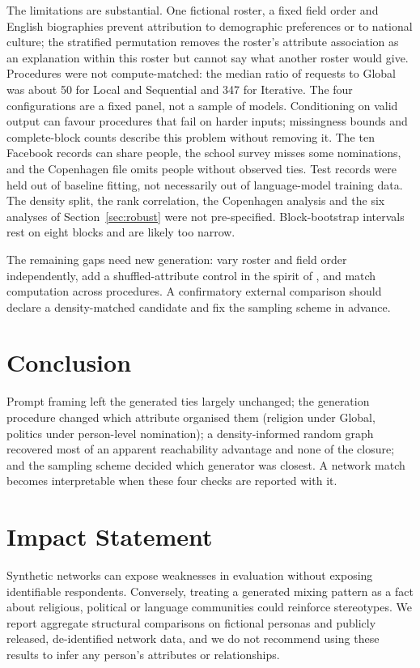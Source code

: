 \documentclass{article}
\begin{document}
The limitations are substantial. One fictional roster, a fixed field order and English biographies prevent attribution to demographic preferences or to national culture; the stratified permutation removes the roster's attribute association as an explanation within this roster but cannot say what another roster would give. Procedures were not compute-matched: the median ratio of requests to Global was about 50 for Local and Sequential and 347 for Iterative. The four configurations are a fixed panel, not a sample of models. Conditioning on valid output can favour procedures that fail on harder inputs; missingness bounds and complete-block counts describe this problem without removing it. The ten Facebook records can share people, the school survey misses some nominations, and the Copenhagen file omits people without observed ties. Test records were held out of baseline fitting, not necessarily out of language-model training data. The density split, the rank correlation, the Copenhagen analysis and the six analyses of Section~\ref{sec:robust} were not pre-specified. Block-bootstrap intervals rest on eight blocks and are likely too narrow.

The remaining gaps need new generation: vary roster and field order independently, add a shuffled-attribute control in the spirit of \citet{chang}, and match computation across procedures. A confirmatory external comparison should declare a density-matched candidate and fix the sampling scheme in advance.

\section{Conclusion}
Prompt framing left the generated ties largely unchanged; the generation procedure changed which attribute organised them (religion under Global, politics under person-level nomination); a density-informed random graph recovered most of an apparent reachability advantage and none of the closure; and the sampling scheme decided which generator was closest. A network match becomes interpretable when these four checks are reported with it.

\section*{Impact Statement}
Synthetic networks can expose weaknesses in evaluation without exposing identifiable respondents. Conversely, treating a generated mixing pattern as a fact about religious, political or language communities could reinforce stereotypes. We report aggregate structural comparisons on fictional personas and publicly released, de-identified network data, and we do not recommend using these results to infer any person's attributes or relationships.
\end{document}
